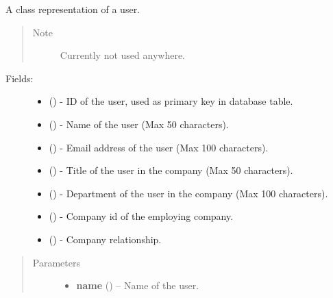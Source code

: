 \documentclass[letterpaper,10pt,english]{sphinxmanual}
\begin{document}

\begin{fulllineitems}
\label{models:models.User}
A class representation of a user.
\begin{quote}\begin{description}
\item[{Note }] \leavevmode
Currently not used anywhere.

\end{description}\end{quote}
\begin{description}
\item[{Fields:}] \leavevmode\begin{itemize}
\item {} 
        ()        - ID of the user, used as primary key in database table.

\item {} 
        ()        - Name of the user (Max 50 characters).

\item {} 
        ()        - Email address of the user (Max 100 characters).

\item {} 
        ()        - Title of the user in the company (Max 50 characters).

\item {} 
        ()        - Department of the user in the company (Max 100 characters).

\item {} 
        ()        - Company id of the employing company.

\item {} 
 ()        - Company relationship.

\end{itemize}

\end{description}
\begin{quote}\begin{description}
\item[{Parameters}] \leavevmode\begin{itemize}
\item {} 
\textbf{name} () -- Name of the user.


\end{itemize}
\end{description}
\end{quote}
\end{fulllineitems}
\end{document}
